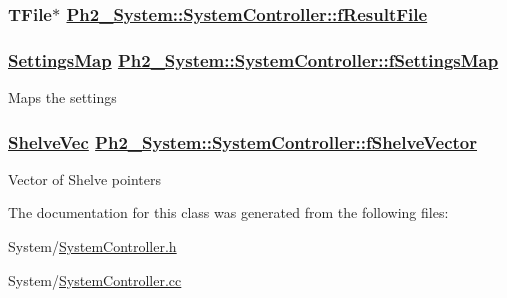\hypertarget{class_ph2___system_1_1_system_controller_46b3561e7e3689dd67b58ac9962e1518}{
\subsubsection[fResultFile]{\setlength{\rightskip}{0pt plus 5cm}TFile$\ast$ \hyperlink{class_ph2___system_1_1_system_controller_46b3561e7e3689dd67b58ac9962e1518}{Ph2\_\-System::System\-Controller::f\-Result\-File}}}
\label{class_ph2___system_1_1_system_controller_46b3561e7e3689dd67b58ac9962e1518}


\hypertarget{class_ph2___system_1_1_system_controller_18fd8d1b9c57b411097430646e1dda9a}{
\subsubsection[fSettingsMap]{\setlength{\rightskip}{0pt plus 5cm}\hyperlink{namespace_ph2___system_f2bca61b7444e1e35ab6bccba079876b}{Settings\-Map} \hyperlink{class_ph2___system_1_1_system_controller_18fd8d1b9c57b411097430646e1dda9a}{Ph2\_\-System::System\-Controller::f\-Settings\-Map}}}
\label{class_ph2___system_1_1_system_controller_18fd8d1b9c57b411097430646e1dda9a}


Maps the settings \hypertarget{class_ph2___system_1_1_system_controller_f40cecc7ed4b9854db0fcb64e287689f}{
\subsubsection[fShelveVector]{\setlength{\rightskip}{0pt plus 5cm}\hyperlink{namespace_ph2___system_1c21eed494ab8a888694adf3de379dcf}{Shelve\-Vec} \hyperlink{class_ph2___system_1_1_system_controller_f40cecc7ed4b9854db0fcb64e287689f}{Ph2\_\-System::System\-Controller::f\-Shelve\-Vector}}}
\label{class_ph2___system_1_1_system_controller_f40cecc7ed4b9854db0fcb64e287689f}


Vector of Shelve pointers 

The documentation for this class was generated from the following files:\begin{CompactItemize}
\item 
System/\hyperlink{_system_controller_8h}{System\-Controller.h}\item 
System/\hyperlink{_system_controller_8cc}{System\-Controller.cc}\end{CompactItemize}
